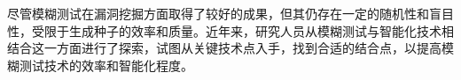 

\begin{conclusion}

尽管模糊测试在漏洞挖掘方面取得了较好的成果，但其仍存在一定的随机性和盲目性，受限于生成种子的效率和质量。近年来，研究人员从模糊测试与智能化技术相结合这一方面进行了探索，试图从关键技术点入手，找到合适的结合点，以提高模糊测试技术的效率和智能化程度。

\end{conclusion}
